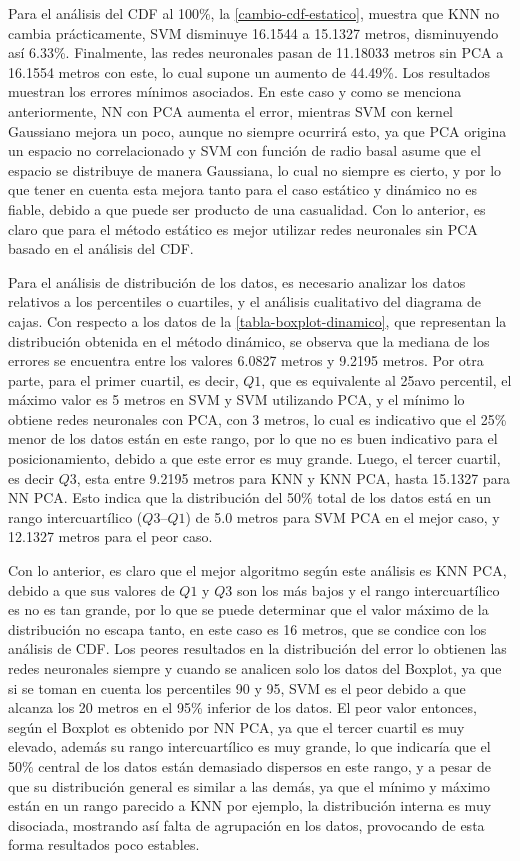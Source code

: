 Para el análisis del CDF al 100\%, la \autoref{cambio-cdf-estatico}, muestra que KNN no cambia prácticamente, SVM disminuye 16.1544 a 15.1327 metros, disminuyendo así 6.33\%. Finalmente, las redes neuronales pasan de 11.18033 metros sin PCA a 16.1554 metros con este, lo cual supone un aumento de 44.49\%.  Los resultados muestran los errores mínimos asociados. En este caso y como se menciona anteriormente, NN con PCA aumenta el error, mientras SVM con kernel Gaussiano mejora un poco, aunque no siempre ocurrirá esto, ya que PCA origina un espacio no correlacionado y SVM con función de radio basal asume que el espacio se distribuye de manera Gaussiana, lo cual no siempre es cierto, y por lo que tener en cuenta esta mejora tanto para el caso estático y dinámico no es fiable, debido a que puede ser producto de una casualidad. Con lo anterior, es claro que para el método estático es mejor utilizar redes neuronales sin PCA basado en el análisis del CDF.

Para el análisis de distribución de los datos, es necesario analizar los datos relativos a los percentiles o cuartiles, y el análisis cualitativo del diagrama de cajas.  Con respecto a los datos de la \autoref{tabla-boxplot-dinamico}, que representan la distribución obtenida en el método dinámico, se observa que la mediana de los errores se encuentra entre los valores 6.0827 metros y 9.2195 metros. Por otra parte, para el primer cuartil, es decir, $Q1$, que es equivalente al 25avo percentil, el máximo valor es 5 metros en SVM y SVM utilizando PCA, y el mínimo lo obtiene redes neuronales con PCA, con 3 metros, lo cual es indicativo que el 25\% menor de los datos están en este rango, por lo que no es buen indicativo para el posicionamiento, debido a que este error es muy grande. Luego, el tercer cuartil, es decir $Q3$, esta entre 9.2195 metros para KNN y KNN PCA, hasta 15.1327 para NN PCA. Esto indica que la distribución del 50\% total de los datos está en un rango intercuartílico ($Q3 – Q1$) de 5.0 metros para SVM PCA en el mejor caso, y 12.1327 metros para el peor caso. 

Con lo anterior, es claro que el mejor algoritmo según este análisis es KNN PCA, debido a que sus valores de $Q1$ y $Q3$ son los más bajos y el rango intercuartílico es no es tan grande, por lo que se puede determinar que el valor máximo de la distribución no escapa tanto, en este caso es 16 metros, que se condice con los análisis de CDF. Los peores resultados en la distribución del error lo obtienen las redes neuronales siempre y cuando se analicen solo los datos del Boxplot, ya que si se toman en cuenta los percentiles 90 y 95, SVM es el peor debido a que alcanza los 20 metros en el 95\% inferior de los datos. El peor valor entonces, según el Boxplot es obtenido por NN PCA, ya que el tercer cuartil es muy elevado, además su rango intercuartílico es muy grande, lo que indicaría que el 50\% central de los datos están demasiado dispersos en este rango, y a pesar de que su distribución general es similar a las demás, ya que el mínimo y máximo están en un rango parecido a KNN por ejemplo, la distribución interna es muy disociada, mostrando así falta de agrupación en los datos, provocando de esta forma resultados poco estables.

